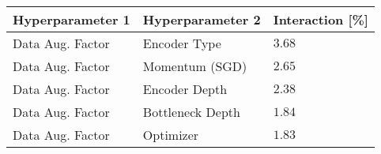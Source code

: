 \begin{tabular}{lll}
\toprule
Hyperparameter 1 & Hyperparameter 2 & Interaction [\%] \\
\midrule
Data Aug. Factor & Encoder Type & $3.68$ \\
Data Aug. Factor & Momentum (SGD) & $2.65$ \\
Data Aug. Factor & Encoder Depth & $2.38$ \\
Data Aug. Factor & Bottleneck Depth & $1.84$ \\
Data Aug. Factor & Optimizer & $1.83$ \\
\bottomrule
\end{tabular}
